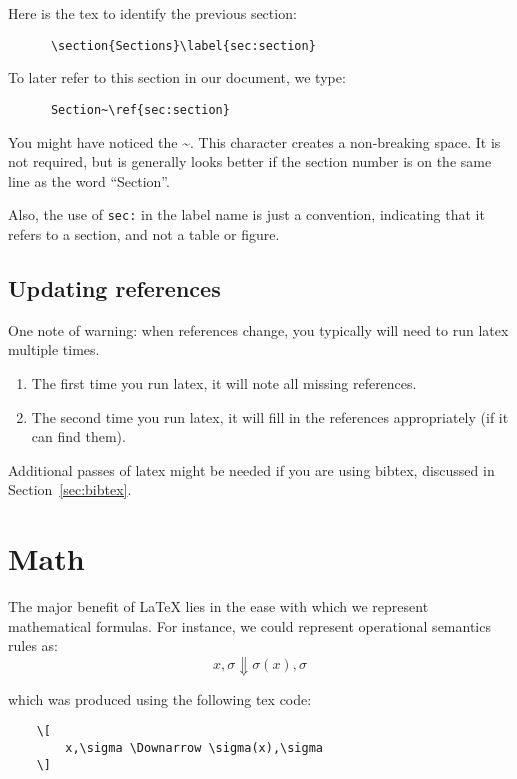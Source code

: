 \documentclass{article}
\begin{document}
Here is the tex to identify the previous section:
\begin{verbatim}
      \section{Sections}\label{sec:section}
\end{verbatim}

To later refer to this section in our document, we type:
\begin{verbatim}
      Section~\ref{sec:section}
\end{verbatim}

\noindent
You might have noticed the \textasciitilde.
This character creates a non-breaking space.
It is not required, but is generally looks better if
the section number is on the same line as the word ``Section''.

Also, the use of {\tt sec:} in the label name is just a convention,
indicating that it refers to a section, and not a table or figure.

\subsection{Updating references}
One note of warning:
when references change, you typically will need to run latex multiple times.
\begin{enumerate}
  \item The first time you run latex, it will note all missing references.
  \item The second time you run latex, it will fill in the references appropriately (if it can find them).
\end{enumerate}

\noindent
Additional passes of latex might be needed if you are using bibtex,
discussed in Section~\ref{sec:bibtex}.

\section{Math}

The major benefit of LaTeX lies in the ease with which we represent mathematical formulas.
For instance, we could represent operational semantics rules as:
\[
  x,\sigma \Downarrow \sigma(x),\sigma
\]

\noindent
which was produced using the following tex code:
\begin{verbatim}
    \[
        x,\sigma \Downarrow \sigma(x),\sigma
    \]
\end{verbatim}
\end{document}
